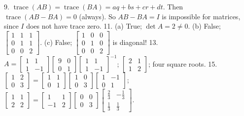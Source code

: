 9. \(\operatorname{trace}(AB)=\operatorname{trace}(BA)=aq+bs+cr+dt\). Then \(\operatorname{trace}(AB-BA)=0\) (always). So \(AB-BA=I\) is impossible for matrices, since \(I\) does not have trace zero.
11. (a) True; \(\det A=2\neq 0\). (b) False; \(\begin{bmatrix}1&1&1\\ 0&1&1\\ 0&0&2\end{bmatrix}\). (c) False; \(\begin{bmatrix}1&0&0\\ 0&1&0\\ 0&0&2\end{bmatrix}\) is diagonal!
13. \(A=\begin{bmatrix}1&1\\ 1&-1\end{bmatrix}\begin{bmatrix}9&0\\ 0&1\end{bmatrix}\begin{bmatrix}1&1\\ 1&-1\end{bmatrix}^{-1}\); \(\begin{bmatrix}2&1\\ 1&2\end{bmatrix}\); four square roots.
15. \(\begin{bmatrix}1&2\\ 0&3\end{bmatrix}=\begin{bmatrix}1&1\\ 0&1\end{bmatrix}\begin{bmatrix}1&0\\ 0&3\end{bmatrix}\begin{bmatrix}1&-1\\ 0&1\end{bmatrix}\); \(\begin{bmatrix}1&1\\ 2&2\end{bmatrix}=\begin{bmatrix}1&1\\ -1&2\end{bmatrix}\begin{bmatrix}0&0\\ 0&3\end{bmatrix}\begin{bmatrix}\frac{2}{3}&-\frac{1}{3}\\ \frac{1}{3}&\frac{1}{3}\end{bmatrix}\).

